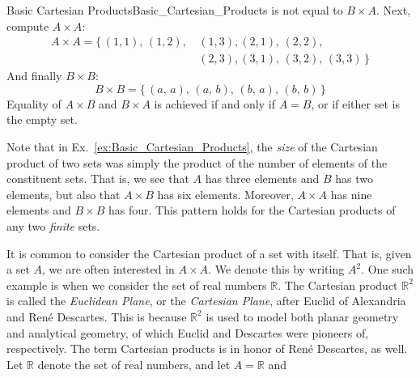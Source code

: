 \begin{fexample}{Basic Cartesian Products}{Basic_Cartesian_Products}
            is not equal to $B\times{A}$. Next, compute $A\times{A}$:
            \begin{equation}
                \begin{split}
                    A\times{A}=\Big\{\,(1,1),\,(1,2),\,&(1,3),
                                       (2,1),\,(2,2),\,\\&(2,3),
                                       (3,1),\,(3,2),\,(3,3)\,\Big\}
                \end{split}
            \end{equation}
            And finally $B\times{B}$:
            \begin{equation}
                B\times{B}=\big\{\,(a,\,a),\,(a,\,b),
                                 \,(b,\,a),\,(b,\,b)\,\big\}
            \end{equation}
            Equality of $A\times{B}$ and $B\times{A}$ is achieved if and only
            if $A=B$, or if either set is the empty set.
        \end{fexample}
        Note that in Ex.~\ref{ex:Basic_Cartesian_Products}, the \textit{size}
        of the Cartesian product of two sets was simply the product of the
        number of elements of the constituent sets. That is, we see that $A$
        has three elements and $B$ has two elements, but also that
        $A\times{B}$ has six elements. Moreover, $A\times{A}$ has nine
        elements and $B\times{B}$ has four. This pattern holds for the
        Cartesian products of any two \textit{finite} sets.
        \par\hfill\par
        It is common to consider the Cartesian product of a set with itself.
        That is, given a set $A$, we are often interested in $A\times{A}$. We
        denote this by writing $A^{2}$. One such example is when we consider
        the set of real numbers $\mathbb{R}$. The Cartesian product
        $\mathbb{R}^{2}$ is called the \textit{Euclidean Plane}, or the
        \textit{Cartesian Plane},
        after Euclid of Alexandria and Ren\'{e}
        Descartes. This is because $\mathbb{R}^{2}$
        is used to model both planar geometry and analytical geometry, of which
        Euclid and Descartes were pioneers of, respectively. The term Cartesian
        products is in honor of Ren\'{e} Descartes, as well. Let $\mathbb{R}$
        denote the set of real numbers, and let $A=\mathbb{R}$ and
